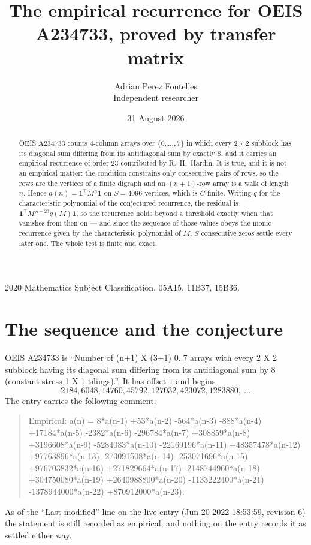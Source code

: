 \documentclass[11pt,a4paper]{article}
\title{The empirical recurrence for OEIS A234733, proved by transfer matrix}
\author{Adrian Perez Fontelles\\ \small Independent researcher}
\date{31 August 2026}
\theoremstyle{plain}
\theoremstyle{definition}
\begin{document}
\maketitle

\begin{abstract}
OEIS A234733 counts $4$-column arrays over $\{0,\dots,7\}$ in which every
$2\times2$ subblock has its diagonal sum differing from its antidiagonal sum by
exactly $8$, and it
carries an empirical recurrence of order $23$ contributed by R.~H.~Hardin. It is true,
and it is not an empirical matter: the condition constrains only consecutive pairs of rows,
so the rows are the vertices of a finite digraph and an $(n+1)$-row array is a walk of
length $n$. Hence $a(n)=\mathbf{1}^{\!\top}M^{n}\mathbf{1}$ on $S=4096$ vertices, which
is $C$-finite. Writing $q$ for the characteristic polynomial of the conjectured recurrence,
the residual is $\mathbf{1}^{\!\top}M^{\,n-23}q(M)\mathbf{1}$, so the recurrence
holds beyond a threshold exactly when that vanishes from then on --- and since the sequence
of those values obeys the monic recurrence given by the characteristic polynomial of $M$,
$S$ consecutive zeros settle every later one. The whole test is finite and exact.
\end{abstract}

\noindent\small 2020 Mathematics Subject Classification. 05A15, 11B37, 15B36.\normalsize

\section{The sequence and the conjecture}

OEIS A234733 is ``Number of (n+1) X (3+1) 0..7 arrays with every 2 X 2 subblock having its diagonal sum differing from its antidiagonal sum by 8 (constant-stress 1 X 1 tilings).''. It has offset
$1$ and begins
\[
2184, 6048, 14760, 45792, 127032, 423072, 1283880,\ \dots
\]
The entry carries the following comment:
\begin{quote}\small
Empirical: a(n) = 8*a(n-1) +53*a(n-2) -564*a(n-3) -888*a(n-4) +17184*a(n-5) -2382*a(n-6) -296784*a(n-7) +308859*a(n-8) +3196608*a(n-9) -5284083*a(n-10) -22169196*a(n-11) +48357478*a(n-12) +97763896*a(n-13) -273091508*a(n-14) -253071696*a(n-15) +976703832*a(n-16) +271829664*a(n-17) -2148744960*a(n-18) +304750080*a(n-19) +2640988800*a(n-20) -1133222400*a(n-21) -1378944000*a(n-22) +870912000*a(n-23).
\end{quote}
As of the ``Last modified'' line on the live entry (Jun 20 2022 18:53:59, revision 6) the statement is
still recorded as empirical, and nothing on the entry records it as settled either way.
\end{document}
